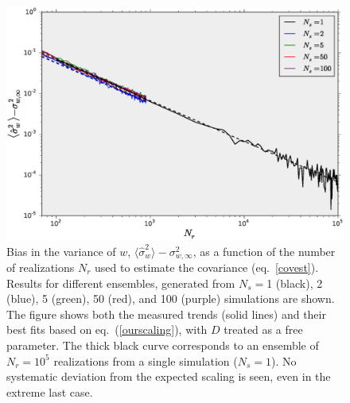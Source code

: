 \documentclass[reprint,aps,prd,superscriptaddress,showkeys,showpacs]{revtex4-1}
\newcommand{\h}[1]{\hat{#1}}
\begin{document}
\begin{figure}
\includegraphics[scale=0.3]{Figures/scaling_nr.eps}
\caption{Bias in the variance of $w$,
  $\langle\h{\sigma}^2_w\rangle-\sigma^2_{w,\infty}$, as a function of
  the number of realizations $N_r$ used to estimate the covariance
  (eq.~\ref{covest}). Results for different ensembles, generated from
  $N_s=$1 (black), 2 (blue), 5 (green), 50 (red), and 100 (purple)
  simulations are shown. The figure shows both the measured trends
  (solid lines) and their best fits based on eq.~(\ref{ourscaling}),
  with $D$ treated as a free parameter.
  The thick black curve corresponds to an ensemble of $N_r=10^5$
  realizations from a single simulation ($N_s=1$).
  No systematic deviation from the expected scaling is seen, even in
  the extreme last case.  }
\label{wvar_nr}
\end{figure}
\end{document}
